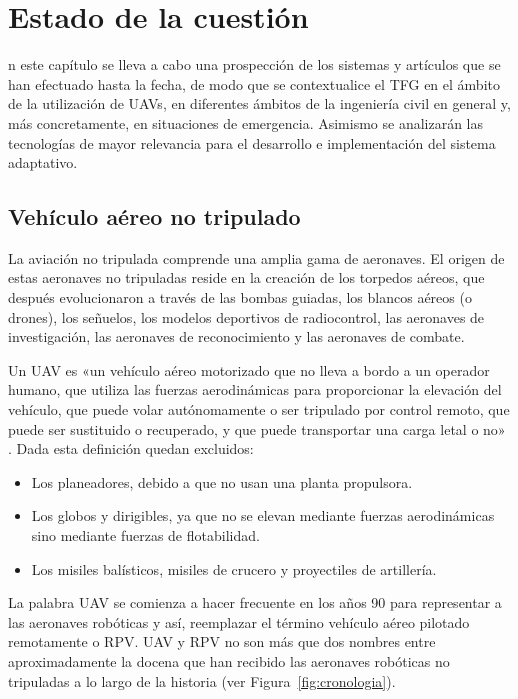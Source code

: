 \chapter{Estado de la cuestión}
\label{chap:antecedentes}

n este capítulo se lleva a cabo una prospección de los sistemas y artículos
que se han efectuado hasta la fecha, de modo que se contextualice el \acs{TFG} en el ámbito 
de la utilización de \acs{UAV}s, en diferentes ámbitos de la ingeniería civil en general y, más
concretamente, en situaciones de emergencia. Asimismo se analizarán las tecnologías de mayor 
relevancia para el desarrollo e implementación del sistema adaptativo.  

\section{Vehículo aéreo no tripulado}
\label{sec:vehiculonotripulado}

La aviación no tripulada comprende una amplia gama de aeronaves. El origen de estas aeronaves no tripuladas reside 
en la creación de los torpedos aéreos, que después evolucionaron a través de las bombas guiadas, los blancos 
aéreos (o drones), los señuelos, los modelos deportivos de radiocontrol, las aeronaves de investigación, 
las aeronaves de reconocimiento y las aeronaves de combate.

Un \acs{UAV} es «un  vehículo  aéreo  motorizado  que no  lleva  a  bordo  a  un  operador  humano,  
que utiliza las fuerzas aerodinámicas para proporcionar la elevación del vehículo, que puede volar autónomamente 
o ser tripulado por control remoto, que puede ser sustituido o recuperado, y que puede transportar una 
carga letal o no» \cite{UAV}. Dada esta definición quedan excluidos:

\begin{itemize}
\item Los planeadores, debido a que no usan una planta propulsora.
\item Los globos y dirigibles, ya que no se elevan mediante fuerzas aerodinámicas sino mediante fuerzas de flotabilidad.
\item Los misiles balísticos, misiles de crucero y proyectiles de artillería.
\end{itemize}

La palabra \acs{UAV} se comienza a hacer frecuente en los años 90 para representar a las aeronaves robóticas 
y así, reemplazar el término vehículo aéreo pilotado remotamente o \acs{RPV}. \acs{UAV} y \acs{RPV} no son más 
que dos nombres entre aproximadamente la docena que han recibido las aeronaves robóticas no tripuladas a lo largo de la historia (ver Figura~\ref{fig:cronologia}).

